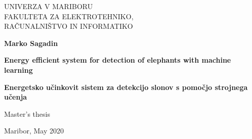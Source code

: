 \begin{titlepage}
    \begin{center}
 
        \fontsize{16}{26}
        \selectfont
        UNIVERZA V MARIBORU\\
        FAKULTETA ZA ELEKTROTEHNIKO,\\
        RAČUNALNIŠTVO IN INFORMATIKO
        \vspace*{4.0cm}

        \textbf{Marko Sagadin}

        \vspace{0.5cm}

        \fontsize{26}{26}
        \selectfont
        \textbf{Energy efficient system for detection of elephants with machine learning}
 
        \vspace{1.0cm}

        \fontsize{26}{26}
        \selectfont
        \textbf{Energetsko učinkovit sistem za detekcijo slonov s pomočjo strojnega učenja}

        \vspace{1.0cm}

        \fontsize{16}{18}
        \selectfont
        Master's thesis
 
        \vspace{6cm}
        Maribor, May 2020 
 
 
    \end{center}
\end{titlepage}
